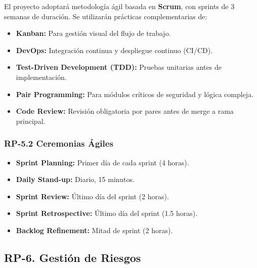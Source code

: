 \documentclass[12pt,a4paper]{article}
\begin{document}
El proyecto adoptará metodología ágil basada en \textbf{Scrum}, con sprints de 3 semanas de duración. Se utilizarán prácticas complementarias de:

\begin{itemize}[noitemsep]
    \item \textbf{Kanban:} Para gestión visual del flujo de trabajo.
    \item \textbf{DevOps:} Integración continua y despliegue continuo (CI/CD).
    \item \textbf{Test-Driven Development (TDD):} Pruebas unitarias antes de implementación.
    \item \textbf{Pair Programming:} Para módulos críticos de seguridad y lógica compleja.
    \item \textbf{Code Review:} Revisión obligatoria por pares antes de merge a rama principal.
\end{itemize}

\subsubsection{RP-5.2 Ceremonias Ágiles}

\begin{itemize}[noitemsep]
    \item \textbf{Sprint Planning:} Primer día de cada sprint (4 horas).
    \item \textbf{Daily Stand-up:} Diario, 15 minutos.
    \item \textbf{Sprint Review:} Último día del sprint (2 horas).
    \item \textbf{Sprint Retrospective:} Último día del sprint (1.5 horas).
    \item \textbf{Backlog Refinement:} Mitad de sprint (2 horas).
\end{itemize}

\subsection{RP-6. Gestión de Riesgos}
\end{document}
